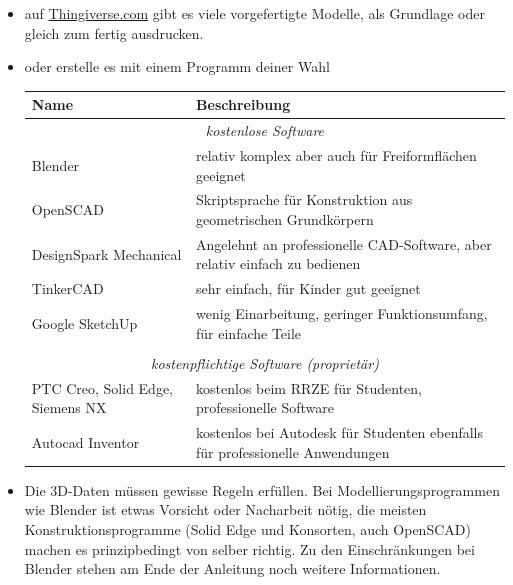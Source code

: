\documentclass{\basedir/fablab-document}
\begin{document}
	\begin{itemize}
		\item auf \href{https://thingiverse.com}{Thingiverse.com} gibt es viele vorgefertigte Modelle, als
		Grundlage oder gleich zum fertig ausdrucken.
		\item oder erstelle es mit einem Programm deiner Wahl
		\begin{table}[H]
			\centering
			\begin{tabularx}{\textwidth}{|l|X|}
				\hline \textbf{Name} & \textbf{Beschreibung} \\
				\hline \multicolumn{2}{|c|}{\textit{kostenlose Software}}  \\
				\hline Blender & relativ komplex aber auch für Freiformflächen geeignet  \\
				\hline OpenSCAD & Skriptsprache für Konstruktion aus geometrischen Grundkörpern \\
				\hline DesignSpark Mechanical & Angelehnt an professionelle CAD-Software, aber relativ einfach zu bedienen  \\
				\hline TinkerCAD & sehr einfach, für Kinder gut geeignet  \\
				\hline Google SketchUp & wenig Einarbeitung, geringer Funktionsumfang, für einfache Teile \\
				\hline & \\
				\hline \multicolumn{2}{|c|}{\textit{kostenpflichtige Software (proprietär)}}  \\
				\hline PTC Creo, Solid Edge, Siemens NX & kostenlos beim RRZE für Studenten, professionelle Software \\
				\hline Autocad Inventor & kostenlos bei Autodesk für Studenten ebenfalls für professionelle Anwendungen \\
				\hline
			\end{tabularx}
		\end{table}
		\item Die 3D-Daten müssen gewisse Regeln erfüllen. Bei Modellierungsprogrammen wie Blender ist etwas Vorsicht oder Nacharbeit nötig, die meisten Konstruktionsprogramme (Solid Edge und Konsorten, auch OpenSCAD) machen es prinzipbedingt von selber richtig. Zu den Einschränkungen bei Blender stehen am Ende der Anleitung noch weitere Informationen.
	\end{itemize}
	
\end{document}
